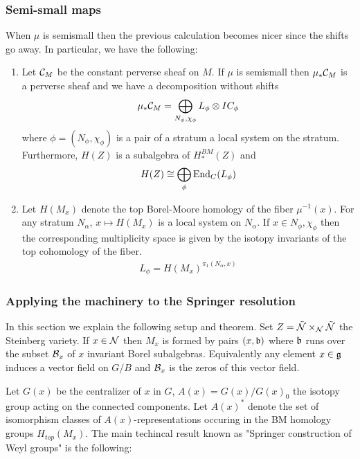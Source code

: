 \documentclass[12pt]{article}
\begin{document}
\subsubsection{Semi-small maps}
When $\mu$ is semismall then the previous calculation becomes nicer
since the shifts go away. In particular, we have the following:
\begin{theorem}
    \begin{enumerate}
        \item Let ${\mathcal{C}}_M$ be the constant perverse sheaf on $M$. If $\mu$ is semismall
              then $\mu_*{\mathcal{C}}_M$ is a perverse sheaf and we have a decomposition without shifts \begin{align*}
                  \mu_*{\mathcal{C}}_M = \bigoplus_{N_\phi,\chi_\phi} L_\phi \otimes IC_\phi
              \end{align*} where $\phi = (N_\phi,\chi_\phi)$ is a pair of a stratum
              a local system on the stratum. Furthermore, $H(Z)$ is a
              subalgebra of $H^{BM}_*(Z)$ and \begin{align*}
                  H(Z) \cong \bigoplus_\phi \operatorname{End}_C(L_\phi)
              \end{align*}
        \item Let $H(M_x)$ denote the top
              Borel-Moore homology of the fiber $\mu^{-1}(x)$. For any
              stratum $N_\alpha$, $x\mapsto H(M_x)$ is a local system on $N_\alpha$.
              If $x\in N_\phi,\chi_\phi$ then the corresponding
                  multiplicity space is given by the isotopy invariants of the
                  top cohomology of the fiber. 
            \begin{align*}
                  L_\phi = H(M_x)^{\pi_1(N_\alpha,x)}
              \end{align*}
    \end{enumerate}
\end{theorem}
\subsubsection{Applying the machinery to the Springer resolution}
In this section we explain the following setup and theorem.
Set $Z = \tilde {{\mathcal{N}}}\times_{\mathcal{N}} \tilde {{\mathcal{N}}}$ the Steinberg variety.
If $x\in {\mathcal{N}}$ then $M_x$ is formed by pairs $(x,\mathfrak{b})$ where $\mathfrak{b}$
runs over the subset ${\mathcal{B}}_x$ of $x$ invariant Borel subalgebras. Equivalently
any element $x\in \mathfrak{g}$ induces a vector field on $G/B$ and ${\mathcal{B}}_x$ is the
zeros of this vector field.

Let $G(x)$ be the centralizer of $x$ in $G$, $A(x) = G(x)/G(x)_0$ the isotopy
group acting on the connected components. Let $A(x)^*$ denote the set of isomorphism classes
of $A(x)$-representations occuring in the BM homology groups $H_{top}(M_x)$.
The main techincal result known as "Springer construction of Weyl groups"
is the following:
\end{document}
